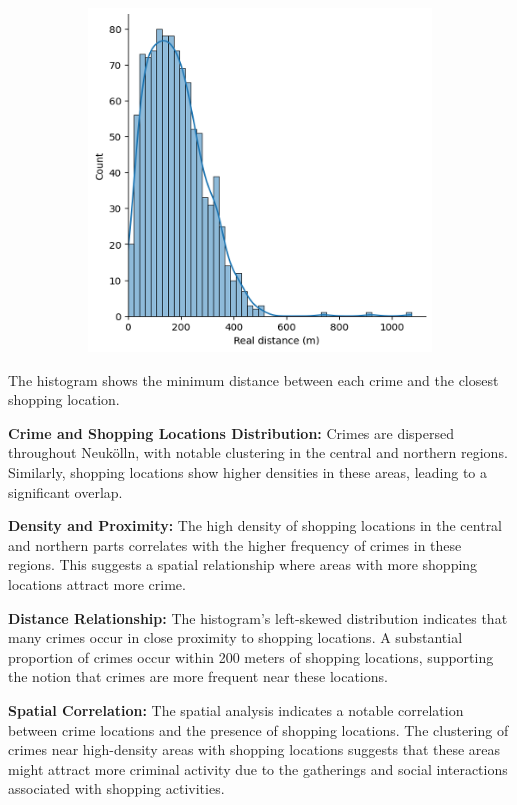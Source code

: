 \begin{figure}[h]
\begin{subfigure}[b]{0.45\textwidth}
        \includegraphics[width=\textwidth]{./figures/Gerard/shopping_1.png}
        \caption{}
        \label{fig:image2}
    \end{subfigure}

\end{figure}
The histogram shows the minimum distance between each crime and the closest shopping location. 

\textbf{Crime and Shopping Locations Distribution:} Crimes are dispersed throughout Neukölln, with notable clustering in the central and northern regions. Similarly, shopping locations show higher densities in these areas, leading to a significant overlap. 

\textbf{Density and Proximity:} The high density of shopping locations in the central and northern parts correlates with the higher frequency of crimes in these regions. This suggests a spatial relationship where areas with more shopping locations attract more crime. 

\textbf{Distance Relationship:} The histogram's left-skewed distribution indicates that many crimes occur in close proximity to shopping locations. A substantial proportion of crimes occur within 200 meters of shopping locations, supporting the notion that crimes are more frequent near these locations. 

\textbf{Spatial Correlation:} The spatial analysis indicates a notable correlation between crime locations and the presence of shopping locations. The clustering of crimes near high-density areas with shopping locations suggests that these areas might attract more criminal activity due to the gatherings and social interactions associated with shopping activities. 

